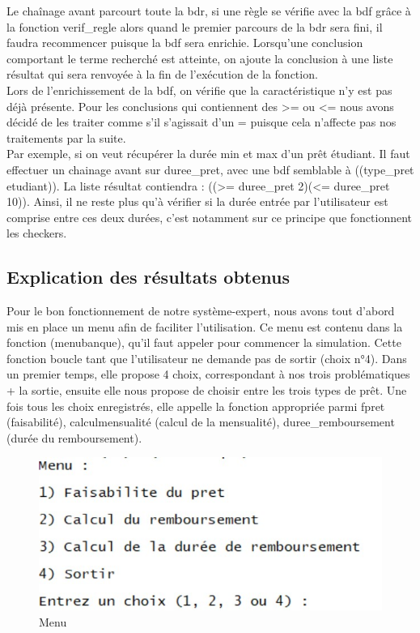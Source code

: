 \documentclass[
]{article}
\begin{document}
Le chaînage avant parcourt toute la bdr, si une règle se vérifie avec la
bdf grâce à la fonction verif\_regle alors quand le premier parcours de
la bdr sera fini, il faudra recommencer puisque la bdf sera enrichie.
Lorsqu'une conclusion comportant le terme recherché est atteinte, on
ajoute la conclusion à une liste résultat qui sera renvoyée à la fin de
l'exécution de la fonction.\\
Lors de l'enrichissement de la bdf, on vérifie que la 
caractéristique n'y est pas déjà présente. Pour les 
conclusions qui contiennent des >= ou <= nous avons 
décidé de les traiter comme s'il s'agissait d'un = puisque 
cela n'affecte pas nos traitements par la suite. \\

Par exemple, si on veut récupérer la durée min et max d'un prêt étudiant.
Il faut effectuer un chainage avant sur duree\_pret, avec une bdf semblable 
à ((type\_pret etudiant)).
La liste résultat contiendra : ((\textgreater= duree\_pret 2)(\textless=
duree\_pret 10)). Ainsi, il ne reste plus qu'à vérifier si la durée
entrée par l'utilisateur est comprise entre ces deux durées, c'est
notamment sur ce principe que fonctionnent les checkers.

\hypertarget{explication-des-ruxe9sultats-obtenus}{%
\subsection{Explication des résultats
obtenus}\label{explication-des-ruxe9sultats-obtenus}}

Pour le bon fonctionnement de notre système-expert, nous avons tout
d'abord mis en place un menu afin de faciliter l'utilisation. 
Ce menu est contenu dans la fonction (menubanque), qu'il
faut appeler pour commencer la simulation. Cette fonction boucle tant 
que l'utilisateur ne demande pas de sortir (choix n°4). Dans un premier
temps, elle propose 4 choix, correspondant à nos trois problématiques + 
la sortie, ensuite elle nous propose de choisir entre les trois types de prêt. 
Une fois tous les choix enregistrés, elle appelle la fonction appropriée 
parmi fpret (faisabilité), calculmensualité (calcul de la mensualité), 
duree\_remboursement (durée du remboursement).

\begin{figure}[H]
\centering
\includegraphics{img/menu.jpg}
\caption{Menu}
\end{figure}
\end{document}

